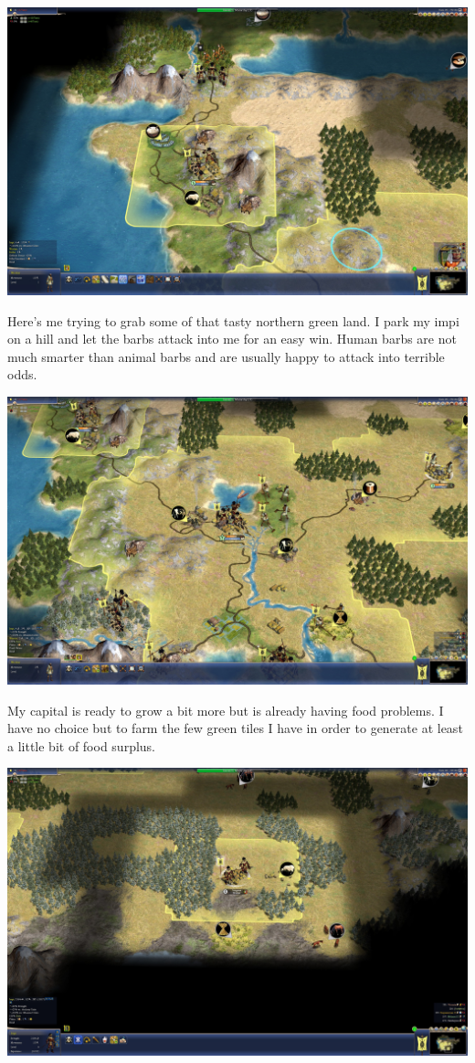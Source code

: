 \documentclass[10pt]{article}
\begin{document}
\includegraphics[width=1.0\textwidth]{50}

Here's me trying to grab some of that tasty northern green land. I park my impi on a hill and let the
barbs attack into me for an easy win. Human barbs are not much smarter than animal barbs and are usually
happy to attack into terrible odds.

\includegraphics[width=1.0\textwidth]{51}

My capital is ready to grow a bit more but is already having food problems. I have no choice but to farm the
few green tiles I have in order to generate at least a little bit of food surplus.

\includegraphics[width=1.0\textwidth]{53}
\end{document}
